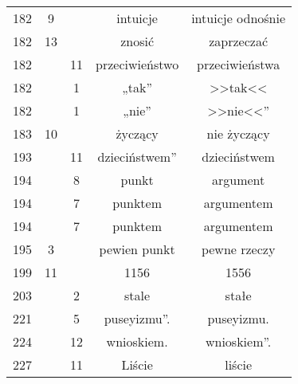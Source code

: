 \documentclass[a4paper,11pt]{article}
\begin{document}
\begin{center}
\begin{tabular}{|c|c|c|c|c|}
    182 &  9 & & intuicje & intuicje odnośnie \\
    182 & 13 & & znosić & zaprzeczać \\
    182 & & 11 & przeciwieństwo & przeciwieństwa \\
    182 & &  1 & „tak” & >>tak<<  %
    \\
    182 & &  1 & „nie” & >>nie<<”  %
    \\
    183 & 10 & & życzący & nie życzący \\
    193 & & 11 & dzieciństwem” & dzieciństwem \\
    194 & &  8 & punkt & argument \\
    194 & &  7 & punktem & argumentem \\
    194 & &  7 & punktem & argumentem \\
    195 &  3 & & pewien punkt & pewne rzeczy \\
    199 & 11 & & 1156 & 1556 \\
    203 & &  2 & stale & stałe \\
    221 & &  5 & puseyizmu”. & puseyizmu. \\
    224 & & 12 & wnioskiem. & wnioskiem”. \\
    227 & & 11 & Liście & liście \\
    \hline
  \end{tabular}






\end{center}
\end{document}
